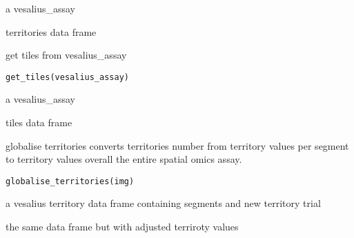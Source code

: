 \documentclass[a4paper]{book}
\begin{document}
%
\begin{Arguments}
\begin{ldescription}
\item[\code{vesalius\_assay}] a vesalius\_assay
\end{ldescription}
\end{Arguments}
%
\begin{Value}
territories data frame
\end{Value}
%
\begin{Description}
get tiles from vesalius\_assay
\end{Description}
%
\begin{Usage}
\begin{verbatim}
get_tiles(vesalius_assay)
\end{verbatim}
\end{Usage}
%
\begin{Arguments}
\begin{ldescription}
\item[\code{vesalius\_assay}] a vesalius\_assay
\end{ldescription}
\end{Arguments}
%
\begin{Value}
tiles data frame
\end{Value}
%
\begin{Description}
globalise territories
converts territories number from territory values per segment
to territory values overall the entire spatial omics assay.
\end{Description}
%
\begin{Usage}
\begin{verbatim}
globalise_territories(img)
\end{verbatim}
\end{Usage}
%
\begin{Arguments}
\begin{ldescription}
\item[\code{img}] a vesalius territory data frame containing segments
and new territory trial
\end{ldescription}
\end{Arguments}
%
\begin{Value}
the same data frame but with adjusted terriroty values
\end{Value}
\end{document}
